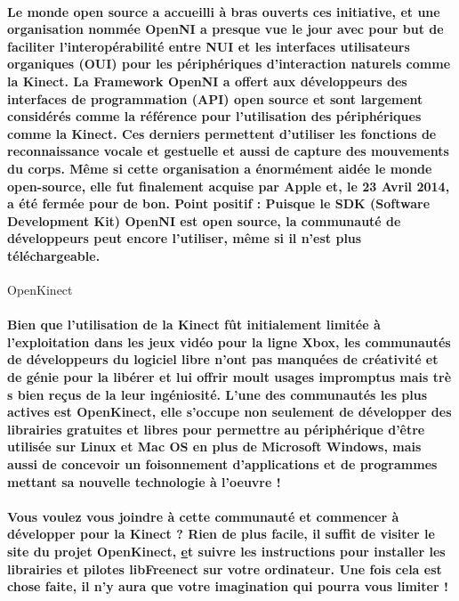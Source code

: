 \paragraph*{Le monde open source a accueilli \`a bras ouverts ces initiative, et une organisation nomm\'ee OpenNI a presque vue le jour avec pour but de faciliter l'interop\'erabilit\'e entre NUI et les interfaces utilisateurs organiques (OUI) pour les p\'eriph\'eriques d'interaction naturels comme la Kinect. La Framework OpenNI a offert aux d\'eveloppeurs des interfaces de programmation (API) open source et sont largement consid\'er\'es comme la r\'ef\'erence pour l'utilisation des p\'eriph\'eriques comme la Kinect. Ces derniers permettent d'utiliser les fonctions de reconnaissance vocale et gestuelle et aussi de capture des mouvements du corps.
M\^eme si cette organisation a \'enorm\'ement aid\'ee le monde open-source, elle fut finalement acquise par Apple et, le 23 Avril 2014, a \'et\'e ferm\'ee pour de bon. Point positif : Puisque le SDK (Software Development Kit) OpenNI est open source, la communaut\'e de d\'eveloppeurs peut encore l'utiliser, m\^eme si il n'est plus t\'el\'echargeable.\\}
\textcolor[rgb]{0.55,0,0}{\Large OpenKinect}
\paragraph*{Bien que l'utilisation de la Kinect f\^ut initialement limit\'ee \`a l'exploitation dans les jeux vid\'eo pour la ligne Xbox, les communaut\'es de d\'eveloppeurs du logiciel libre n'ont pas manqu\'ees de cr\'eativit\'e et de g\'enie pour la lib\'erer et lui offrir moult usages impromptus mais tr\`e s bien reçus de la leur ing\'eniosit\'e. L'une des communaut\'es les plus actives est OpenKinect, elle s'occupe non seulement de d\'evelopper des librairies gratuites et libres pour permettre au p\'eriph\'erique d'\^etre utilis\'ee sur Linux et Mac OS en plus de Microsoft Windows, mais aussi de concevoir un foisonnement d'applications et de programmes mettant sa nouvelle technologie \`a l'oeuvre !}
\paragraph*{Vous voulez vous joindre \`a cette communaut\'e et commencer \`a d\'evelopper pour la Kinect ? Rien de plus facile, il suffit de visiter le site du projet OpenKinect, \href{http://www.openkinect.org} et suivre les instructions pour installer les librairies et pilotes libFreenect sur votre ordinateur. Une fois cela est chose faite, il n'y aura que votre imagination qui pourra vous limiter !\\}